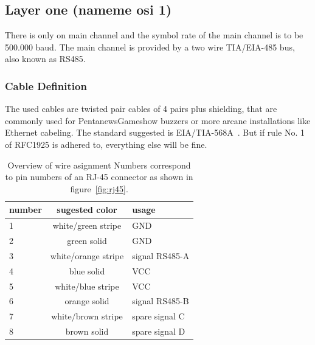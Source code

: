 \documentclass[a4paper,12pt]{scrartcl}
\begin{document}

\subsection{Layer one (nameme osi 1)}
There is only on main channel and the symbol rate of the main channel is to be 500.000 baud. 
The main channel is provided by a two wire TIA/EIA-485 \cite{EIA485} bus, also known as RS485.


\subsubsection{Cable Definition}
The used cables are twisted pair cables of 4 pairs plus shielding, that are commonly used for PentanewsGameshow buzzers
or more arcane installations like Ethernet cabeling.
The standard suggested is EIA/TIA-568A~\cite{EIA568}. But if rule No. 1 of RFC1925 \cite{RFC1925} is adhered to, everything else will be fine.

\begin{table}
	\centering
	\begin{tabular}{l c l}
		number        & sugested color      & usage \\
		\hline
		1             & white/green stripe  &   GND \\
		2             & green solid         &   GND \\
		3             & white/orange stripe &   signal RS485-A\\
		4             & blue solid          &   VCC \\
		5             & white/blue stripe   &   VCC \\
		6             & orange solid        &   signal RS485-B\\
		7             & white/brown stripe  &   spare signal C \\
		8             & brown solid         &   spare signal D \\
	\end{tabular}
	\caption{%
	Overview of wire asignment  \newline%
	Numbers correspond to pin numbers of an RJ-45 connector as shown in figure~\ref{fig:rj45}.
	}
	\label{tab:wires}
\end{table}
\end{document}

